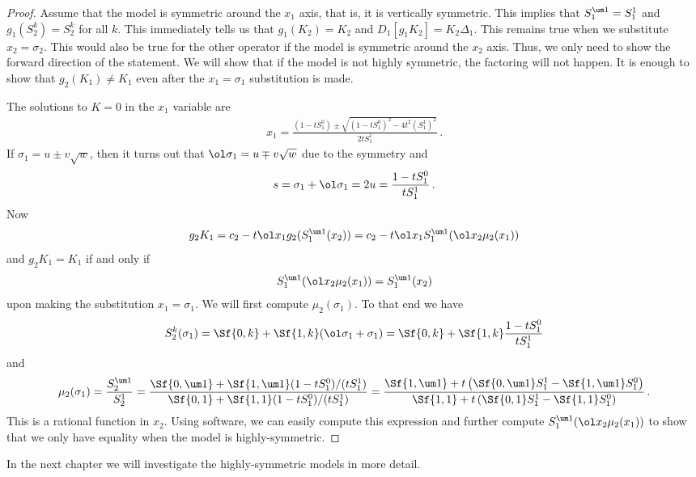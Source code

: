 \begin{proof} Assume that the model is symmetric around the $x_1$ axis, that is, it is vertically symmetric. This implies that $S_1^{\um 1} = S_1^1$ and $g_1(S_2^k) = S_2^k$ for all $k$. This immediately tells us that $g_1(K_2) = K_2$ and $D_1[g_1K_2] = K_2 \Delta_1$. This remains true when we substitute $x_2 = \sigma_2$. This would also be true for the other operator if the model is symmetric around the $x_2$ axis. Thus, we only need to show the forward direction of the statement. We will show that if the model is not highly symmetric, the factoring will not happen. It is enough to show that $g_2(K_1) \neq K_1$ even after the $x_1 = \sigma_1$ substitution is made.

The solutions to $K = 0$ in the $x_1$ variable are
\begin{align}
	x_1 = \frac{(1-t S_1^0) \pm \sqrt{(1-tS_1^0)^2 - 4t^2(S_1^1)^2}}{2tS_1^1}\,.
\end{align}
If $\sigma_1 = u \pm v\sqrt{w}$, then it turns out that $\ol \sigma_1 = u \mp v\sqrt{w}$ due to the symmetry and
\begin{align}
	s = \sigma_1 + \ol \sigma_1 = 2u = \frac{1-tS_1^0}{t S_1^1}\,.
\end{align}
Now
\begin{align}
	g_2 K_1 = c_2 - t \ol x_1 g_2(S_1^{\um 1}(x_2)) = c_2 - t\ol x_1 S_1^{\um 1}(\ol x_2\mu_2(x_1))
\end{align}
and $g_2 K_1 = K_1$ if and only if
\begin{align}
	S_1^{\um 1}(\ol x_2\mu_2(x_1)) = S_1^{\um 1}(x_2)
\end{align}
upon making the substitution $x_1 = \sigma_1$. We will first compute $\mu_2(\sigma_1)$. To that end we have
\begin{align}
	S_2^k(\sigma_1) = \Sf{0,k}+ \Sf{1,k}(\ol \sigma_1+ \sigma_1) = \Sf{0,k}+ \Sf{1,k}\frac{1-tS_1^0}{t S_1^1}
\end{align}
and
\begin{align}
	\mu_2(\sigma_1) = \frac{S_2^{\um 1}}{S_2^1} = \frac{ \Sf{0,\um 1}+ \Sf{1,\um 1}(1-tS_1^0)/(t S_1^1)}{\Sf{0,1}+ \Sf{1,1}(1-tS_1^0)/(t S_1^1)} = \frac{\Sf{1, \um 1}+t\left(\Sf{0,\um 1}S_1^1-\Sf{1,\um 1}S_1^0\right)}{\Sf{1, 1}+t\left(\Sf{0, 1}S_1^1-\Sf{1, 1}S_1^0\right)}\,.
\end{align}
This is a rational function in $x_2$. Using software, we can easily compute this expression and further compute $S_1^{\um 1}(\ol x_2\mu_2(x_1))$ to show that we only have equality when the model is highly-symmetric.

\end{proof}
In the next chapter we will investigate the highly-symmetric models in more detail.

